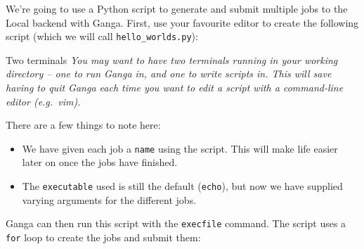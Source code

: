We're going to use a Python script to generate and submit multiple jobs
to the Local backend with Ganga. First, use your favourite editor to
create the following script (which we will call
\texttt{hello\_worlds.py}):

\begin{Shaded}
\end{Shaded}

\begin{hintbox}{Two terminals}
\emph{You may want to have two terminals running in your working directory --
one to run Ganga in, and one to write scripts in. This will save having
to quit Ganga each time you want to edit a script with a command-line
editor (e.g.~vim).}
\end{hintbox}

There are a few things to note here:

\begin{itemize}
\tightlist
\item
  We have given each job a \texttt{name} using the script. This will
  make life easier later on once the jobs have finished.
\item
  The \texttt{executable} used is still the default (\texttt{echo}), but
  now we have supplied varying arguments for the different jobs.
\end{itemize}

Ganga can then run this script with the \texttt{execfile} command. The
script uses a \texttt{for} loop to create the jobs and submit them:

\begin{Shaded}
\begin{Highlighting}[]
 \NormalTok{)}
\NormalTok{[} \NormalTok{updates on the job submission ...]}
\end{Highlighting}
\end{Shaded}


